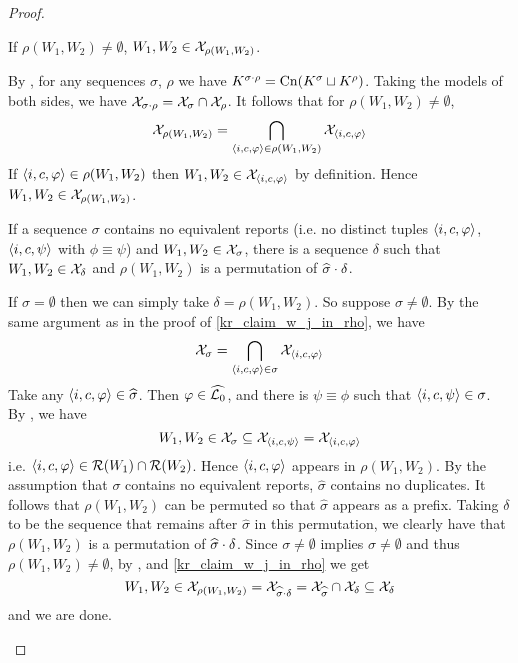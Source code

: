\begin{proof}
    \begin{claim}
        \label{kr_claim_w_j_in_rho}
        If $\rho(W_1, W_2) \ne \emptyset$, $W_1, W_2 \in \mathcal{X}_{\rho(W_1, W_2)}$.
    \end{claim}
    \begin{claimproof}
        By \kconj{}, for any sequences $\sigma$, $\rho$ we have
        $K^{\sigma \cdot \rho} = \operatorname{Cn}(K^\sigma \sqcup K^\rho)$.  Taking the
        models of both sides, we have $\mathcal{X}_{\sigma \cdot \rho} = \mathcal{X}_\sigma
        \cap \mathcal{X}_\rho$. It follows that for $\rho(W_1, W_2) \ne \emptyset$,
        \[
            \mathcal{X}_{\rho(W_1, W_2)}
            = \bigcap_{\langle {i, c, \varphi} \rangle \in \rho(W_1, W_2)}{\mathcal{X}_{\langle {i, c,
            \varphi} \rangle}}
        \]
        If $\langle {i, c, \varphi} \rangle \in \rho(W_1, W_2)$ then $W_1, W_2 \in
        \mathcal{X}_{\langle {i, c, \varphi} \rangle}$ by definition. Hence $W_1, W_2 \in
        \mathcal{X}_{\rho(W_1, W_2)}$.
    \end{claimproof}

    \begin{claim}
        \label{kr_claim_exists_delta}
        If a sequence $\sigma$ contains no equivalent reports (i.e. no distinct
        tuples $\langle {i, c, \varphi} \rangle$, $\langle {i, c, \psi} \rangle$ with $\phi \equiv
        \psi$) and $W_1, W_2 \in \mathcal{X}_\sigma$, there is a sequence $\delta$ such
        that $W_1, W_2 \in \mathcal{X}_\delta$ and $\rho(W_1, W_2)$ is a permutation of
        $\widehat{\sigma} \cdot \delta$.
    \end{claim}
    \begin{claimproof}
        If $\sigma = \emptyset$ then we can simply take $\delta = \rho(W_1,
        W_2)$. So suppose $\sigma \ne \emptyset$. By the same argument as in
        the proof of \cref{kr_claim_w_j_in_rho}, we have
        \[
            \mathcal{X}_\sigma = \bigcap_{\langle {i, c, \varphi} \rangle \in \sigma}{\mathcal{X}_{\langle {i, c,
            \varphi} \rangle}}
        \]
        Take any $\langle {i, c, \varphi} \rangle \in \widehat{\sigma}$. Then $\varphi \in
        \widehat{\mathcal{L}{}_0}$, and there is $\psi \equiv \phi$ such that $\langle {i,
        c, \psi} \rangle \in \sigma$. By \equivpost{}, we have
        \[
            W_1, W_2
            \in \mathcal{X}_\sigma
            \subseteq \mathcal{X}_{\langle {i, c, \psi} \rangle}
            = \mathcal{X}_{\langle {i, c, \varphi} \rangle}
        \]
        i.e. $\langle {i, c, \varphi} \rangle \in \mathcal{R}(W_1) \cap \mathcal{R}(W_2)$. Hence
        $\langle {i, c, \varphi} \rangle$ appears in $\rho(W_1, W_2)$. By the assumption
        that $\sigma$ contains no equivalent reports, $\widehat{\sigma}$
        contains no duplicates. It follows that $\rho(W_1, W_2)$ can be
        permuted so that $\widehat{\sigma}$ appears as a prefix. Taking
        $\delta$ to be the sequence that remains after $\widehat{\sigma}$ in
        this permutation, we clearly have that $\rho(W_1, W_2)$ is a
        permutation of $\widehat{\sigma} \cdot \delta$. Since $\sigma \ne
        \emptyset$ implies $\widehat{\sigma} \ne \emptyset$ and thus $\rho(W_1,
        W_2) \ne \emptyset$, by \rearr{}, \kconj{} and
        \cref{kr_claim_w_j_in_rho} we get
        \[
            W_1, W_2 \in \mathcal{X}_{\rho(W_1, W_2)}
            = \mathcal{X}_{\widehat{\sigma} \cdot \delta}
            = \mathcal{X}_{\widehat{\sigma}} \cap \mathcal{X}_\delta
            \subseteq \mathcal{X}_\delta
        \]
        and we are done.
    \end{claimproof}


\end{proof}
